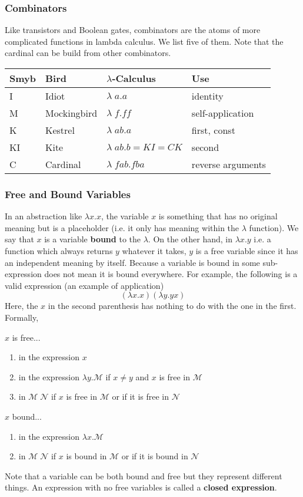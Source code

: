 \documentclass{article}
\begin{document}
  \subsubsection{Combinators}
  Like transistors and Boolean gates, combinators are the atoms of more complicated functions in lambda calculus. We list five of them. Note that the cardinal can be build from other combinators. 
  \begin{center}
      \begin{tabular}{l|l|l|l}
      Smyb & Bird & $\lambda$-Calculus & Use \\
      \hline
      I & Idiot & $\lambda\;a.a$ & identity \\
      M & Mockingbird & $\lambda\;f.ff$ & self-application \\
      K & Kestrel & $\lambda\;ab.a $ & first, const \\
      KI & Kite & $\lambda\;ab.b = KI = CK$ & second \\
      C & Cardinal & $\lambda\;fab.fba$ & reverse arguments
  \end{tabular}
  \end{center}


  \subsubsection{Free and Bound Variables}
  In an abstraction like $\lambda x . x$, the variable $x$ is something that has no original meaning but is a placeholder (i.e. it only has meaning within the $\lambda$ function). We say that $x$ is a variable \textbf{bound} to the $\lambda$. On the other hand, in $\lambda x . y$ i.e. a function which always returns $y$ whatever it takes, $y$ is a free variable since it has an independent meaning by itself. Because a variable is bound in some sub-expression does not mean it is bound everywhere. For example, the following is a valid expression (an example of application)
  \[(\lambda x . x) ( \lambda y. y x)\]
  Here, the $x$ in the second parenthesis has nothing to do with the one in the first. Formally, 

  \begin{definition}
  $x$ is free...
  \begin{enumerate}
      \item in the expression $x$
      \item in the expression $\lambda y. \mathcal{M}$ if $x \neq y $ and $x$ is free in $\mathcal{M}$ 
      \item in $\mathcal{M}\; \mathcal{N}$ if $x$ is free in $\mathcal{M}$ or if it is free in $\mathcal{N}$ 
  \end{enumerate}
  $x$ bound...
  \begin{enumerate}
      \item in the expression $\lambda x. \mathcal{M}$
      \item in $\mathcal{M} \; \mathcal{N}$ if $x$ is bound in $\mathcal{M}$ or if it is bound in $\mathcal{N}$
  \end{enumerate}
  \end{definition}
  Note that a variable can be both bound and free but they represent different things. An expression with no free variables is called a \textbf{closed expression}. 
\end{document}
